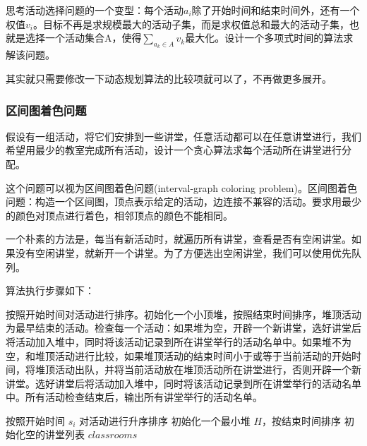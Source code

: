 \documentclass[./../main.tex]{subfiles}
\begin{document}
思考活动选择问题的一个变型：每个活动$a_{i}$除了开始时间和结束时间外，还有一个权值$v_{i}$。目标不再是求规模最大的活动子集，而是求权值总和最大的活动子集，也就是选择一个活动集合A，使得$\sum_{a_{k}\in A}v_{k}$最大化。设计一个多项式时间的算法求解该问题。

其实就只需要修改一下动态规划算法的比较项就可以了，不再做更多展开。

\subsubsection{区间图着色问题}
假设有一组活动，将它们安排到一些讲堂，任意活动都可以在任意讲堂进行，我们希望用最少的教室完成所有活动，设计一个贪心算法求每个活动所在讲堂进行分配。

这个问题可以视为区间图着色问题(interval-graph coloring problem)。区间图着色问题：构造一个区间图，顶点表示给定的活动，边连接不兼容的活动。要求用最少的颜色对顶点进行着色，相邻顶点的颜色不能相同。

一个朴素的方法是，每当有新活动时，就遍历所有讲堂，查看是否有空闲讲堂。如果没有空闲讲堂，就新开一个讲堂。为了方便选出空闲讲堂，我们可以使用优先队列。

算法执行步骤如下：

按照开始时间对活动进行排序。初始化一个小顶堆，按照结束时间排序，堆顶活动为最早结束的活动。检查每一个活动：如果堆为空，开辟一个新讲堂，选好讲堂后将活动加入堆中，同时将该活动记录到所在讲堂举行的活动名单中。如果堆不为空，和堆顶活动进行比较，如果堆顶活动的结束时间小于或等于当前活动的开始时间，将堆顶活动出队，并将当前活动放在堆顶活动所在讲堂进行，否则开辟一个新讲堂。选好讲堂后将活动加入堆中，同时将该活动记录到所在讲堂举行的活动名单中。所有活动检查结束后，输出所有讲堂举行的活动名单。

\begin{algorithm}[t]
\caption{最小讲堂分配算法（区间图着色）}

\BlankLine
按照开始时间 $s_i$ 对活动进行升序排序\; 
初始化一个最小堆 $H$，按结束时间排序\;
初始化空的讲堂列表 $classrooms$\;


\;
\end{algorithm}
\end{document}
